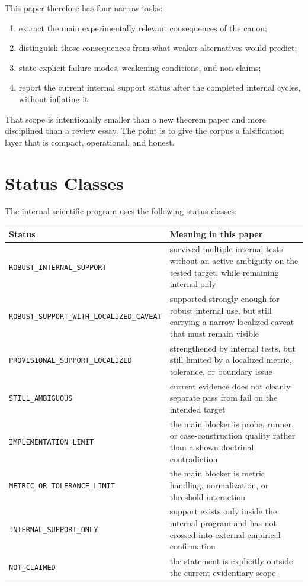 \documentclass[11pt,a4paper]{article}
\newcommand{\Status}[1]{\texttt{#1}}
\begin{document}
This paper therefore has four narrow tasks:
\begin{enumerate}[leftmargin=1.5em]
\item extract the main experimentally relevant consequences of the canon;
\item distinguish those consequences from what weaker alternatives would predict;
\item state explicit failure modes, weakening conditions, and non-claims;
\item report the current internal support status after the completed internal cycles, without inflating it.
\end{enumerate}

That scope is intentionally smaller than a new theorem paper and more disciplined than a review essay. The point is to give the corpus a falsification layer that is compact, operational, and honest.

\section{Status Classes}
The internal scientific program uses the following status classes:

\begin{center}
\renewcommand{\arraystretch}{1.18}
\setlength{\tabcolsep}{5pt}
\begin{tabularx}{\linewidth}{@{}lY@{}}
\toprule
Status & Meaning in this paper \\
\midrule
\Status{ROBUST\_INTERNAL\_SUPPORT} & survived multiple internal tests without an active ambiguity on the tested target, while remaining internal-only \\
\Status{ROBUST\_SUPPORT\_WITH\_LOCALIZED\_CAVEAT} & supported strongly enough for robust internal use, but still carrying a narrow localized caveat that must remain visible \\
\Status{PROVISIONAL\_SUPPORT\_LOCALIZED} & strengthened by internal tests, but still limited by a localized metric, tolerance, or boundary issue \\
\Status{STILL\_AMBIGUOUS} & current evidence does not cleanly separate pass from fail on the intended target \\
\Status{IMPLEMENTATION\_LIMIT} & the main blocker is probe, runner, or case-construction quality rather than a shown doctrinal contradiction \\
\Status{METRIC\_OR\_TOLERANCE\_LIMIT} & the main blocker is metric handling, normalization, or threshold interaction \\
\Status{INTERNAL\_SUPPORT\_ONLY} & support exists only inside the internal program and has not crossed into external empirical confirmation \\
\Status{NOT\_CLAIMED} & the statement is explicitly outside the current evidentiary scope \\
\bottomrule
\end{tabularx}
\end{center}
\end{document}
